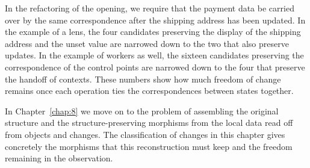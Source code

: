 In the refactoring of the opening, we require that the payment data be carried over by the
same correspondence after the shipping address has been updated.
In the example of a lens, the four candidates preserving the display of the shipping address
and the unset value are narrowed down to the two that also preserve updates.
In the example of workers as well, the sixteen candidates preserving the correspondence of
the control points are narrowed down to the four that preserve the handoff of contexts.
These numbers show how much freedom of change remains once each operation ties the
correspondences between states together.

In Chapter~\ref{chap:8} we move on to the problem of assembling the original structure and
the structure-preserving morphisms from the local data read off from objects and changes.
The classification of changes in this chapter gives concretely the morphisms that this
reconstruction must keep and the freedom remaining in the observation.
